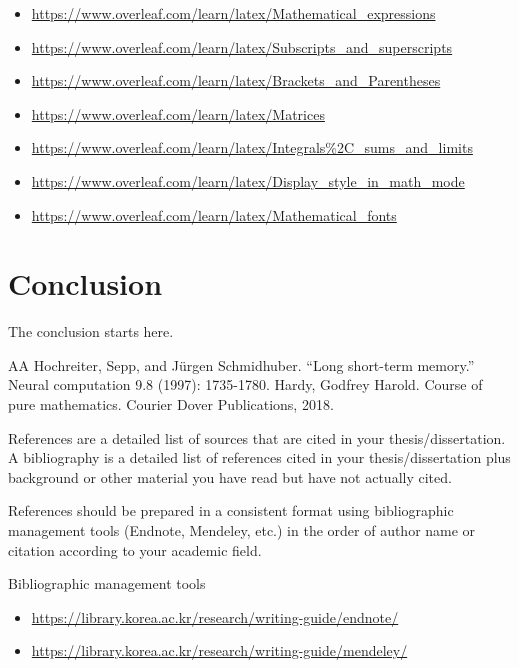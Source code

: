 \documentclass[11pt]{report}
\begin{document}
\small

\begin{itemize}
\item
\url{https://www.overleaf.com/learn/latex/Mathematical_expressions}
\item
\url{https://www.overleaf.com/learn/latex/Subscripts_and_superscripts}
\item
\url{https://www.overleaf.com/learn/latex/Brackets_and_Parentheses}
\item
\url{https://www.overleaf.com/learn/latex/Matrices}
\item
\url{https://www.overleaf.com/learn/latex/Integrals\%2C_sums_and_limits}
\item
\url{https://www.overleaf.com/learn/latex/Display_style_in_math_mode}
\item
\url{https://www.overleaf.com/learn/latex/Mathematical_fonts}
\end{itemize}

\normalsize




\chapter{Conclusion}\label{chap:conclusion}
The conclusion starts here.

\newpage
\renewcommand\bibname{Reference}
\begin{thebibliography}{AA}
 Hochreiter, Sepp, and Jürgen Schmidhuber. ``Long short-term memory.'' Neural computation 9.8 (1997): 1735-1780.
 Hardy, Godfrey Harold. Course of pure mathematics. Courier Dover Publications, 2018.
\end{thebibliography}

\vspace{1cm}

\normalsize
References are a detailed list of sources that are cited in your thesis/dissertation. A bibliography is a detailed list of references cited in your thesis/dissertation plus background or other material you have read but have not actually cited.

References should be prepared in a consistent format using bibliographic management tools (Endnote, Mendeley, etc.) in the order of author name or citation according to your academic field.


Bibliographic management tools
\begin{itemize}
\item\url{https://library.korea.ac.kr/research/writing-guide/endnote/}
\item\url{https://library.korea.ac.kr/research/writing-guide/mendeley/}
\end{itemize}
\end{document}
